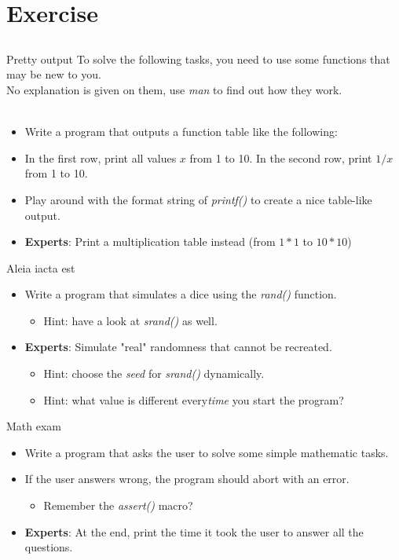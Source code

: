\section{Exercise}
\subsection{}
\begin{frame}{Pretty output}
	To solve the following tasks, you need to use some functions that may be new to you. \\
	No explanation is given on them, use \textit{man} to find out how they work. \\ \ \\
	\begin{itemize}
		\item Write a program that outputs a function table like the following:
		\item In the first row, print all values $x$ from 1 to 10. In the second row, print $1/x$ from 1 to 10.
		\item Play around with the format string of \textit{printf()} to create a nice table-like output.
		\item \textbf{Experts}: Print a multiplication table instead (from $1*1$ to $10*10$)
	\end{itemize}
\end{frame}
\begin{frame}{Aleia iacta est}
	\begin{itemize}
		\item Write a program that simulates a dice using the \textit{rand()} function.
		\begin{itemize}
			\item<2-> Hint: have a look at \textit{srand()} as well.
		\end{itemize}
		\item \textbf{Experts}: Simulate "real" randomness that cannot be recreated.
		\begin{itemize}
			\item<3-> Hint: choose the \textit{seed} for \textit{srand()} dynamically.
			\item<4-> Hint: what value is different every\textit{time} you start the program?
		\end{itemize}
	\end{itemize}
\end{frame}
\begin{frame}{Math exam}
	\begin{itemize}
		\item Write a program that asks the user to solve some simple mathematic tasks.
		\item If the user answers wrong, the program should abort with an error.
		\begin{itemize}
			\item<2-> Remember the \textit{assert()} macro?
		\end{itemize}
		\item \textbf{Experts}: At the end, print the time it took the user to answer all the questions.
	\end{itemize}
\end{frame}

